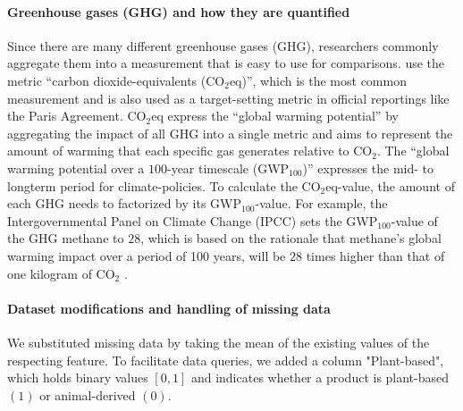 \documentclass{article}
\begin{document}
\paragraph*{Greenhouse gases (GHG) and how they are quantified}
Since there are many different greenhouse gases (GHG), researchers commonly aggregate them into a measurement that is easy to use for comparisons. 
\citet{Poore2018} use the metric 
``carbon dioxide-equivalents (CO$_{2}$eq)'', which is the most common measurement and is  also used as a target-setting metric in official reportings like the Paris Agreement. CO$_{2}$eq express the ``global warming potential'' by aggregating the impact of all GHG into a single metric  and  aims to represent the amount of warming that each specific gas generates relative to CO$_2$. The ``global warming potential over a $100$-year timescale (GWP$_{100}$)'' expresses the mid- to longterm period for climate-policies. To calculate the CO$_{2}$eq-value, the amount of each GHG needs to factorized by its GWP$_{100}$-value. For example, the Intergovernmental Panel on Climate Change (IPCC) sets the GWP$_{100}$-value of the GHG  methane to $28$, which is based on the rationale that methane's global warming impact over a period of 100 years, will be $28$ times higher than that of one kilogram of CO$_2$ \cite{IPCC}.



\paragraph{Dataset modifications and handling of missing data}

We substituted  missing  data by taking the mean of the existing values of the respecting feature. To facilitate data queries, we added a column "Plant-based", which holds binary values $[0,1]$ and indicates whether a product is plant-based $(1)$ or animal-derived $(0)$.
\end{document}
